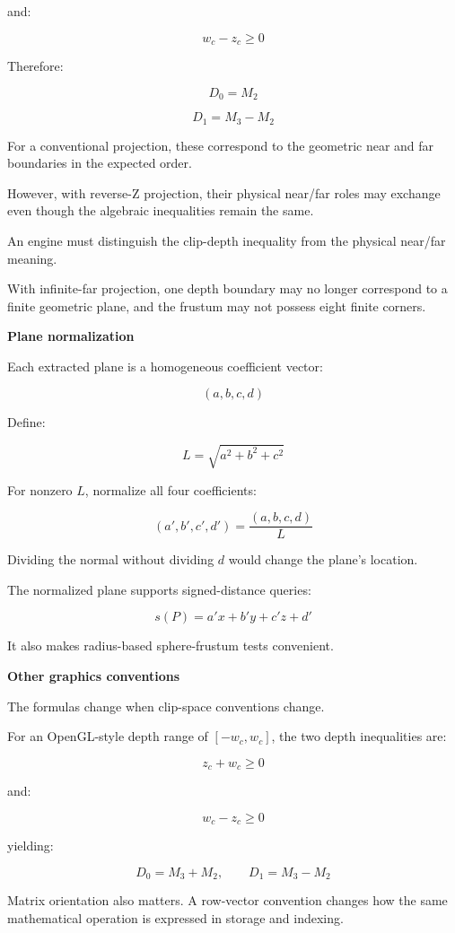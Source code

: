 and:

\[
w_c-z_c\ge0
\]

Therefore:

\[
\boxed{D_0=M_2}
\]

\[
\boxed{D_1=M_3-M_2}
\]

For a conventional projection, these correspond to the geometric near and far boundaries in the expected order.

However, with reverse-Z projection, their physical near/far roles may exchange even though the algebraic inequalities remain the same.

An engine must distinguish the clip-depth inequality from the physical near/far meaning.

With infinite-far projection, one depth boundary may no longer correspond to a finite geometric plane, and the frustum may not possess eight finite corners.

\textbf{Plane normalization}

Each extracted plane is a homogeneous coefficient vector:

\[
(a,b,c,d)
\]

Define:

\[
L=\sqrt{a^2+b^2+c^2}
\]

For nonzero \(L\), normalize all four coefficients:

\[
(a',b',c',d')= \frac{(a,b,c,d)}{L}
\]

Dividing the normal without dividing \(d\) would change the plane's location.

The normalized plane supports signed-distance queries:

\[
s(P)=a'x+b'y+c'z+d'
\]

It also makes radius-based sphere-frustum tests convenient.

\textbf{Other graphics conventions}

The formulas change when clip-space conventions change.

For an OpenGL-style depth range of \([-w_c,w_c]\), the two depth inequalities are:

\[
z_c+w_c\ge0
\]

and:

\[
w_c-z_c\ge0
\]

yielding:

\[
D_0=M_3+M_2,\qquad D_1=M_3-M_2
\]

Matrix orientation also matters. A row-vector convention changes how the same mathematical operation is expressed in storage and indexing.


